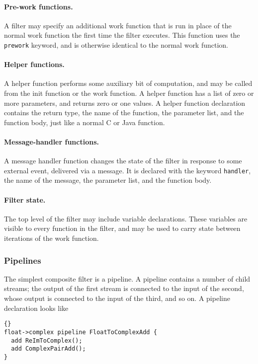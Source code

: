 \documentclass[11pt]{article}
\begin{document}
\paragraph{Pre-work functions.}  A filter may specify an additional
work function that is run in place of the normal work function the
first time the filter executes.  This function uses the
\lstinline|prework| keyword, and is otherwise identical to the normal
work function.

\paragraph{Helper functions.}  A helper function performs some
auxiliary bit of computation, and may be called from the init function
or the work function.  A helper function has a list of zero or more
parameters, and returns zero or one values.  A helper function
declaration contains the return type, the name of the function, the
parameter list, and the function body, just like a normal C or Java
function.

\paragraph{Message-handler functions.}  A message handler function
changes the state of the filter in response to some external event,
delivered via a message.  It is declared with the keyword
\lstinline|handler|, the name of the message, the parameter list, and
the function body.

\paragraph{Filter state.}  The top level of the filter may include
variable declarations.  These variables are visible to every function
in the filter, and may be used to carry state between iterations of
the work function.


\subsubsection{Pipelines}

The simplest composite filter is a pipeline.  A pipeline contains a
number of child streams; the output of the first stream is connected
to the input of the second, whose output is connected to the input of
the third, and so on.  A pipeline declaration looks like

\begin{lstlisting}{}
float->complex pipeline FloatToComplexAdd {
  add ReImToComplex();
  add ComplexPairAdd();
}
\end{lstlisting}
\end{document}
